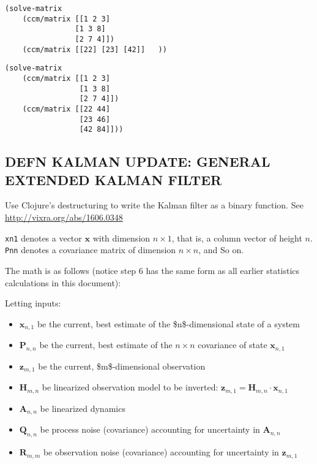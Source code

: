 \documentclass[10pt,oneside,x11names]{article}
\begin{document}
\begin{verbatim}
(solve-matrix
    (ccm/matrix [[1 2 3]
                [1 3 8]
                [2 7 4]])
    (ccm/matrix [[22] [23] [42]]   ))
\end{verbatim}

\begin{verbatim}
(solve-matrix
    (ccm/matrix [[1 2 3]
                 [1 3 8]
                 [2 7 4]])
    (ccm/matrix [[22 44]
                 [23 46]
                 [42 84]]))
\end{verbatim}

\subsection{DEFN KALMAN UPDATE: GENERAL EXTENDED KALMAN FILTER}
\label{general-extended-kalman-filter}
Use Clojure's destructuring to write the Kalman filter as a binary
function. See \url{http://vixra.org/abs/1606.0348}

\texttt{xn1} denotes a vector \(\boldsymbol{x}\) with dimension \(n\times{1}\),
that is, a column vector of height \(n\). \texttt{Pnn} denotes a covariance
matrix of dimension \(n\times{n}\), and So on.

The math is as follows (notice step 6 has the same form as all earlier
statistics calculations in this document):

Letting inputs:

\begin{itemize}
\item \(\boldsymbol{x}_{n,1}\) be the current, best estimate of the
\$n\$-dimensional state of a system
\item \(\boldsymbol{P}_{n,n}\) be the current, best estimate of the
\(n\times{n}\) covariance of state \(\boldsymbol{x}_{n,1}\)
\item \(\boldsymbol{z}_{m,1}\) be the current, \$m\$-dimensional observation
\item \(\boldsymbol{H}_{m,n}\) be linearized observation model to be inverted:
\(\boldsymbol{z}_{m,1}=\boldsymbol{H}_{m,n}\cdot\boldsymbol{x}_{n,1}\)
\item \(\boldsymbol{A}_{n,n}\) be linearized dynamics
\item \(\boldsymbol{Q}_{n,n}\) be process noise (covariance) accounting for
uncertainty in \(\boldsymbol{A}_{n,n}\)
\item \(\boldsymbol{R}_{m,m}\) be observation noise (covariance) accounting
for uncertainty in \(\boldsymbol{z}_{m,1}\)
\end{itemize}
\end{document}
